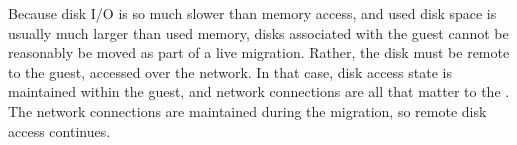 Because disk I/O is so much slower than memory access, and used disk space is usually much larger than used memory, disks associated with the guest cannot be reasonably be moved as part of a live migration.
Rather, the disk must be remote to the guest, accessed over the network.
In that case, disk access state is maintained within the guest, and network connections are all that matter to the .
The network connections are maintained during the migration, so remote disk access continues.

